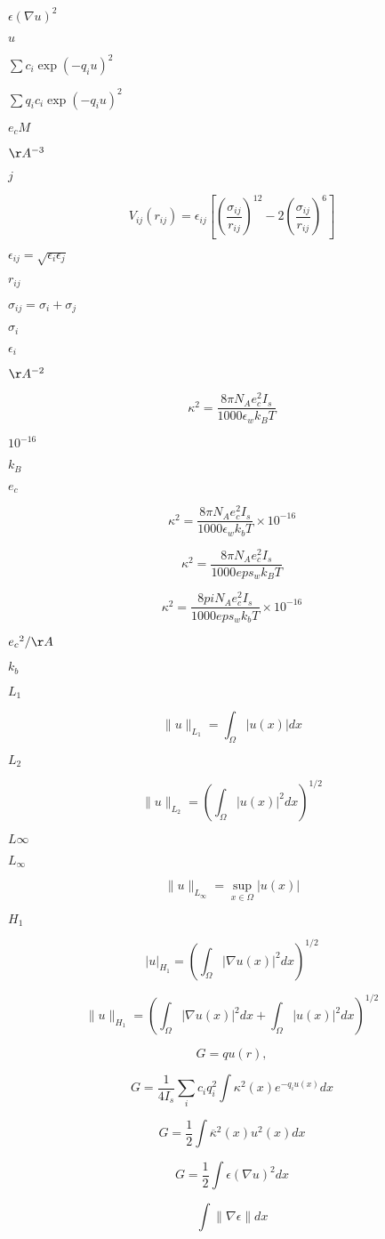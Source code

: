 \documentclass{article}
\begin{document}
$\epsilon (\nabla u)^2$
\pagebreak

$u$
\pagebreak

$\sum c_i \exp (-q_i u)^2$
\pagebreak

$\sum q_i c_i \exp (-q_i u)^2$
\pagebreak

$e_c M$
\pagebreak

$\AA^{-3}$
\pagebreak

$j$
\pagebreak

\[ V_{ij}(r_{ij}) = \epsilon_{ij} \left[ \left( \frac{\sigma_{ij}}{r_{ij}} \right)^{12} - 2 \left( \frac{\sigma_{ij}}{r_{ij}} \right)^{6} \right] \]
\pagebreak

$\epsilon_{ij} = \sqrt{\epsilon_i \epsilon_j}$
\pagebreak

$r_{ij}$
\pagebreak

$\sigma_{ij} = \sigma_i + \sigma_j$
\pagebreak

$\sigma_i$
\pagebreak

$\epsilon_i$
\pagebreak

$\AA^{-2}$
\pagebreak

\[ \kappa^2 = \frac{8 \pi N_A e_c^2 I_s}{1000 \epsilon_w k_B T} \]
\pagebreak

$10^{-16}$
\pagebreak

$k_B$
\pagebreak

$e_c$
\pagebreak

\[ \kappa^2 = \frac{8 \pi N_A e_c^2 I_s}{1000 \epsilon_w k_b T} \times 10^{-16} \]
\pagebreak

\[ \kappa^2 = \frac{8 \pi N_A e_c^2 I_s}{1000 eps_w k_B T} \]
\pagebreak

\[ \kappa^2 = \frac{8 pi N_A e_c^2 I_s}{1000 eps_w k_b T} \times 10^{-16} \]
\pagebreak

${e_c}^2/\AA$
\pagebreak

$k_b$
\pagebreak

$L_1$
\pagebreak

\[ \| u \|_{L_1} = \int_\Omega | u(x) | dx \]
\pagebreak

$L_2$
\pagebreak

\[ \| u \|_{L_2} = \left( \int_\Omega | u(x) |^2 dx \right)^{1/2} \]
\pagebreak

$L\infty$
\pagebreak

$L_\infty$
\pagebreak

\[ \| u \|_{L_\infty} = \sup_{x \in \Omega} | u(x) | \]
\pagebreak

$H_1$
\pagebreak

\[ | u |_{H_1} = \left( \int_\Omega |\nabla u(x)|^2 dx \right)^{1/2} \]
\pagebreak

\[ \| u \|_{H_1} = \left( \int_\Omega |\nabla u(x)|^2 dx + \int_\Omega |u(x)|^2 dx \right)^{1/2} \]
\pagebreak

\[ G = q u(r), \]
\pagebreak

\[ G = \frac{1}{4 I_s} \sum_i c_i q_i^2 \int \kappa^2(x) e^{-q_i u(x)} dx \]
\pagebreak

\[ G = \frac{1}{2} \int \overline{\kappa}^2(x) u^2(x) dx \]
\pagebreak

\[ G = \frac{1}{2} \int \epsilon (\nabla u)^2 dx \]
\pagebreak

\[ \int \| \nabla \epsilon \| dx \]
\pagebreak
\end{document}
